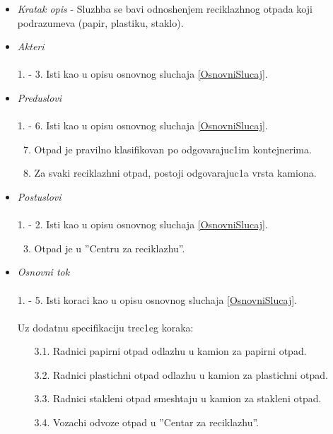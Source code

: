 \documentclass[10 pt]{article}
\begin{document}
		\begin{itemize}
			\item\textit{Kratak opis} - Sluzhba se bavi odnoshenjem reciklazhnog otpada koji podrazumeva (papir, plastiku, staklo).
			
			\item\textit{Akteri}\\\\ 
			1. - 3. Isti kao u opisu osnovnog sluchaja \ref{OsnovniSlucaj}. 
			
			\item\textit{Preduslovi}\\\\ 
			1. - 6. Isti kao u opisu osnovnog sluchaja \ref{OsnovniSlucaj}.
				\begin{enumerate}
					\setcounter{enumi}{6}
					\item Otpad je pravilno klasifikovan po odgovarajuc1im kontejnerima.
					\item Za svaki reciklazhni otpad, postoji odgovarajuc1a vrsta kamiona.
				\end{enumerate}
			
			\item\textit{Postuslovi}\\\\
				1. - 2. Isti kao u opisu osnovnog sluchaja \ref{OsnovniSlucaj}.
				\begin{enumerate}
					\setcounter{enumi}{2}
					\item Otpad je u ''Centru za reciklazhu''.
				\end{enumerate}
		
			\item\textit{Osnovni tok}\\\\
			1. - 5. Isti koraci kao u opisu osnovnog sluchaja \ref{OsnovniSlucaj}.\\\\
			Uz dodatnu specifikaciju trec1eg koraka:
				\begin{enumerate}
					\item [3.1.] Radnici papirni otpad odlazhu u kamion za papirni otpad.
					\item [3.2.] Radnici plastichni otpad odlazhu u kamion za plastichni otpad.
					\item [3.3.] Radnici stakleni otpad smeshtaju u kamion za stakleni otpad.
					\item [3.4.] Vozachi odvoze otpad u ''Centar za reciklazhu''.
				\end{enumerate}
		\end{itemize}
	
\end{document}
